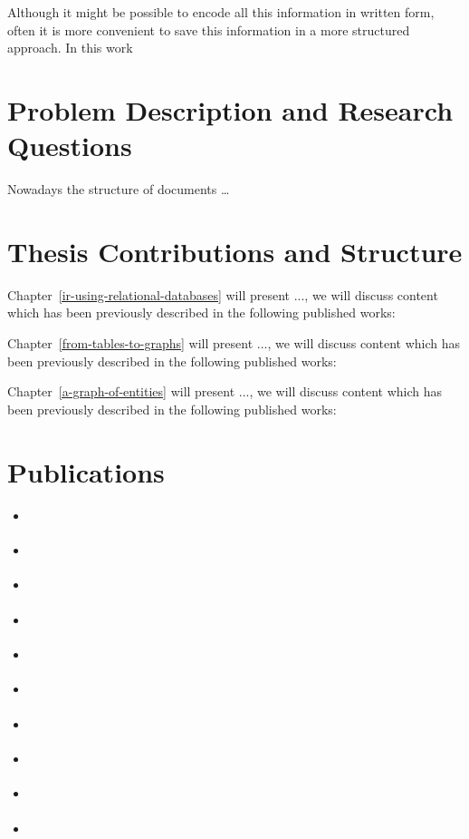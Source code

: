 Although it might be possible to encode all this information in written form, often it is more convenient to save this information in a more structured approach. In this work 

\section{Problem Description and Research Questions}
Nowadays the structure of documents \ldots


\section{Thesis Contributions and Structure}

Chapter~\ref{ir-using-relational-databases} will present ..., we will discuss content which has been previously described in the following published works: \cite{Kamphuis2020BM25, olddog-docker}

Chapter~\ref{from-tables-to-graphs} will present ..., we will discuss content which has been previously described in the following published works: \cite{need-graph-db, geesedb}

Chapter~\ref{a-graph-of-entities} will present ..., we will discuss content which has been previously described in the following published works: \cite{rebl}

\section{Publications}

\begin{itemize}
	\item \cite{olddog-docker}
	\item \cite{need-graph-db}
	\item \cite{trec-2019}
	\item \cite{ciff}	
	\item \cite{Kamphuis2020BM25}
	\item \cite{trec-2020}
	\item \cite{trec-covid}
	\item \cite{graphdb-for-ir}
	\item \cite{geesedb}
	\item \cite{rebl}
\end{itemize}
